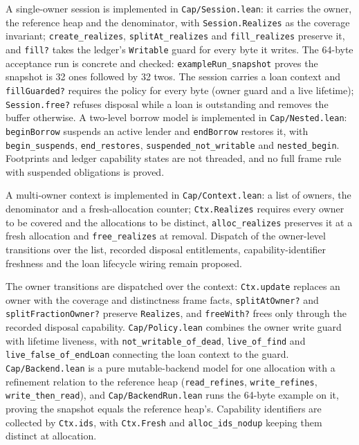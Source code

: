 \documentclass[10pt,a4paper]{article}
\newcommand{\file}[1]{\texttt{\small #1}}
\begin{document}
A single-owner session is implemented in \file{Cap/Session.lean}: it carries the
owner, the reference heap and the denominator, with \texttt{Session.Realizes} as the
coverage invariant; \texttt{create\_realizes}, \texttt{splitAt\_realizes} and \texttt{fill\_realizes}
preserve it, and \texttt{fill?} takes the ledger's \texttt{Writable} guard for every byte it
writes. The 64-byte acceptance run is concrete and checked: \texttt{exampleRun\_snapshot}
proves the snapshot is 32 ones followed by 32 twos. The session carries a loan
context and \texttt{fillGuarded?} requires the policy for every byte (owner guard
and a live lifetime); \texttt{Session.free?} refuses disposal while a loan is
outstanding and removes the buffer otherwise. A two-level borrow model is implemented in
\file{Cap/Nested.lean}: \texttt{beginBorrow} suspends an active lender and
\texttt{endBorrow} restores it, with \texttt{begin\_suspends},
\texttt{end\_restores}, \texttt{suspended\_not\_writable} and
\texttt{nested\_begin}. Footprints and ledger capability states are not threaded,
and no full frame rule with suspended obligations is proved.

A multi-owner context is implemented in \file{Cap/Context.lean}: a list of
owners, the denominator and a fresh-allocation counter; \texttt{Ctx.Realizes}
requires every owner to be covered and the allocations to be distinct,
\texttt{alloc\_realizes} preserves it at a fresh allocation and
\texttt{free\_realizes} at removal. Dispatch of the owner-level transitions over
the list, recorded disposal entitlements, capability-identifier freshness and the
loan lifecycle wiring remain proposed.

The owner transitions are dispatched over the context: \texttt{Ctx.update}
replaces an owner with the coverage and distinctness frame facts,
\texttt{splitAtOwner?} and \texttt{splitFractionOwner?} preserve
\texttt{Realizes}, and \texttt{freeWith?} frees only through the recorded
disposal capability. \file{Cap/Policy.lean} combines the owner write guard with
lifetime liveness, with \texttt{not\_writable\_of\_dead},
\texttt{live\_of\_find} and \texttt{live\_false\_of\_endLoan} connecting the
loan context to the guard. \file{Cap/Backend.lean} is a pure mutable-backend
model for one allocation with a refinement relation to the reference heap
(\texttt{read\_refines}, \texttt{write\_refines}, \texttt{write\_then\_read}),
and \file{Cap/BackendRun.lean} runs the 64-byte example on it, proving the
snapshot equals the reference heap's. Capability identifiers are collected by
\texttt{Ctx.ids}, with \texttt{Ctx.Fresh} and \texttt{alloc\_ids\_nodup} keeping
them distinct at allocation.
\end{document}
